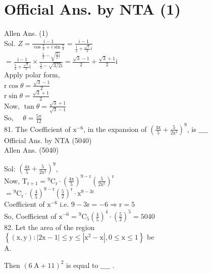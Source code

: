 \documentclass[10pt]{article}
\begin{document}
\section*{Official Ans. by NTA (1)}
Allen Ans. (1)\\
Sol. \(Z=\frac{i-1}{\cos \frac{\pi}{3}+i \sin \frac{\pi}{3}}=\frac{i-1}{\frac{1}{2}+\frac{\sqrt{3}}{2} i}\)\\
\(=\frac{\mathrm{i}-1}{\frac{1}{2}+\frac{\sqrt{3}}{2} \mathrm{i}} \times \frac{\frac{1}{2}-\sqrt{\frac{3}{2} \mathrm{i}}}{\frac{1}{2}-\sqrt{3 / 2} \mathrm{i}}=\frac{\sqrt{3}-1}{2}+\frac{\sqrt{3}+1}{2} \mathrm{i}\)\\
Apply polar form,\\
\(\mathrm{r} \cos \theta=\frac{\sqrt{3}-1}{2}\)\\
\(\mathrm{r} \sin \theta=\frac{\sqrt{3}+1}{2}\)\\
Now, \(\tan \theta=\frac{\sqrt{3}+1}{\sqrt{3}-1}\)\\
So, \(\quad \theta=\frac{5 \pi}{12}\)\\
81. The Coefficient of \(\mathrm{x}^{-6}\), in the expansion of \(\left(\frac{4 \mathrm{x}}{5}+\frac{5}{2 \mathrm{x}^{2}}\right)^{9}\), is \(\_\_\_\_\)\\
Official Ans. by NTA (5040)\\
Allen Ans. (5040)

Sol: \(\left(\frac{4 \mathrm{x}}{5}+\frac{5}{2 \mathrm{x}^{2}}\right)^{9}\),\\
Now, \(\mathrm{T}_{\mathrm{r}+1}={ }^{9} \mathrm{C}_{\mathrm{r}} \cdot\left(\frac{4 \mathrm{x}}{5}\right)^{9-\mathrm{r}}\left(\frac{5}{2 \mathrm{x}^{2}}\right)^{\mathrm{r}}\)\\
\(={ }^{9} \mathrm{C}_{\mathrm{r}} \cdot\left(\frac{4}{5}\right)^{9-\mathrm{r}}\left(\frac{5}{2}\right)^{\mathrm{r}} \cdot \mathrm{x}^{9-3 \mathrm{r}}\)\\
Coefficient of \(\mathrm{x}^{-6}\) i.e. \(9-3 \mathrm{r}=-6 \Rightarrow \mathrm{r}=5\)\\
So, Coefficient of \(\mathrm{x}^{-6}={ }^{9} \mathrm{C}_{5}\left(\frac{4}{5}\right)^{4} \cdot\left(\frac{5}{2}\right)^{5}=5040\)\\
82. Let the area of the region\\
\(\left\{(\mathrm{x}, \mathrm{y}):|2 \mathrm{x}-1| \leq \mathrm{y} \leq\left|\mathrm{x}^{2}-\mathrm{x}\right|, 0 \leq \mathrm{x} \leq 1\right\}\) be\\
A.

Then \((6 \mathrm{~A}+11)^{2}\) is equal to \(\_\_\_\_\) .
\end{document}
